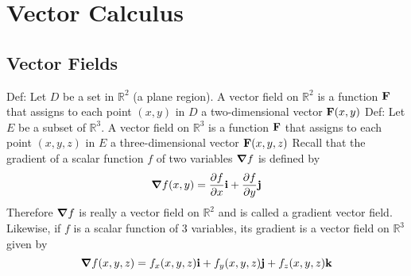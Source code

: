 \documentclass{article}
\begin{document}
    \section{Vector Calculus} %
    \begin{multicols}{2}
        

    \subsection{Vector Fields} %
    \begin{outline}
        \1 Def: Let $D$ be a set in \(\mathbb R^2\) (a plane region). A vector field on \(\mathbb R^2\) is a function \(\vb F\) that assigns to each point \((x,y)\) in $D$ a two-dimensional vector \(\vb F(x,y)\)
        \1 Def: Let $E$ be a subset of \(\mathbb R^3\). A vector field on \(\mathbb R^3\) is a function \(\vb F\) that assigns to each point \((x,y,z)\) in $E$ a three-dimensional vector \(\vb F(x,y,z)\)
        \1 Recall that the gradient of a scalar function $f$ of two variables \(\grad f\) is defined by \[\grad f(x,y)=\pdv{f}{x}\vb i+\pdv{f}{y}\vb j\] Therefore \(\grad f\) is really a vector field on \(\mathbb R^2\) and is called a gradient vector field. Likewise, if $f$ is a scalar function of 3 variables, its gradient is a vector field on \(\mathbb R^3\) given by \[\grad f(x,y,z)=f_x(x,y,z)\vb i+f_y(x,y,z)\vb j+f_z(x,y,z)\vb k\]
        
    \end{outline}    \end{multicols}
\end{document}
